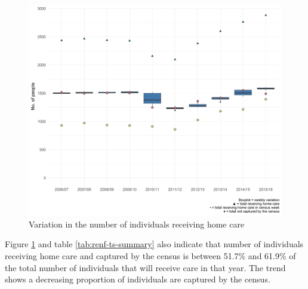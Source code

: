 \documentclass[]{article}
\begin{document}
\begin{figure}[h]
  \centering
    \includegraphics{figures/chapter-renf/06-individual-weekly-variation.png}
    \caption{Variation in the number of individuals receiving home care}
    \label{fig:renf-hrs}
\end{figure}

Figure \ref{fig:renf-hrs} and table \ref{tab:renf-ts-summary} also
indicate that number of individuals receiving home care and captured by
the census is between 51.7\% and 61.9\% of the total number of
individuals that will receive care in that year. The trend shows a
decreasing proportion of individuals are captured by the census.
\end{document}
